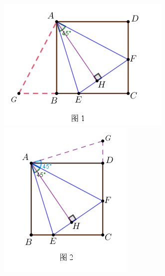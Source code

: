 \documentclass[10pt]{ctexart}
\begin{document}
\begin{figure}[htp]
	 \begin{minipage}{0.5\linewidth}
		 \centering
		 \includegraphics[scale=0.8]{figure/banjiao02.png}
		 \end{minipage}
	 \begin{minipage}{0.5\linewidth}
		 \centering
		 \includegraphics[scale=0.8]{figure/banjiao03.png}
		 \end{minipage}
	 \end{figure}
\end{document}
